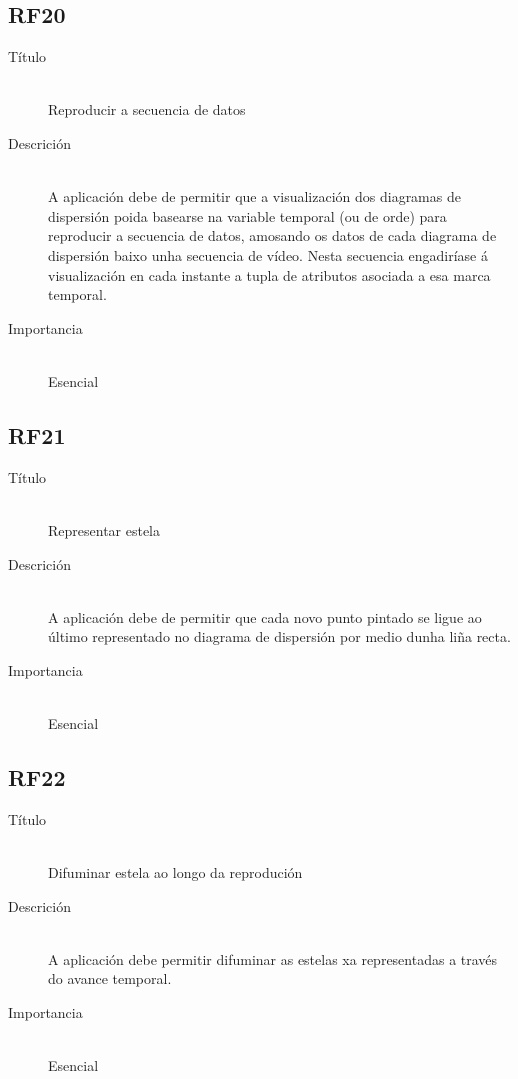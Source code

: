 \subsection*{RF20}
\begin{description}
\item[Título] \hfill \\
Reproducir a secuencia de datos
\item[Descrición] \hfill \\
A aplicación debe de permitir que a visualización dos diagramas de dispersión poida basearse na variable temporal (ou de orde) para reproducir a secuencia de datos, amosando os datos de cada diagrama de dispersión baixo unha secuencia de vídeo. Nesta secuencia engadiríase á visualización en cada instante a tupla de atributos asociada a esa marca temporal. 
\item[Importancia] \hfill \\
Esencial
\end{description}

\subsection*{RF21}
\begin{description}
\item[Título] \hfill \\
Representar estela
\item[Descrición] \hfill \\
A aplicación debe de permitir que cada novo punto pintado se ligue ao último representado no diagrama de dispersión por medio dunha liña recta.
\item[Importancia] \hfill \\
Esencial
\end{description}

\subsection*{RF22}
\begin{description}
\item[Título] \hfill \\
Difuminar estela ao longo da reprodución
\item[Descrición] \hfill \\
A aplicación debe permitir difuminar as estelas xa representadas a través do avance temporal.
\item[Importancia] \hfill \\
Esencial
\end{description}

